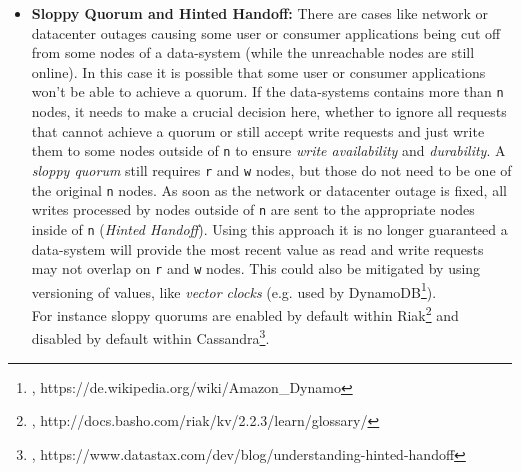 {\begin{itemize}
\item \textbf{Sloppy Quorum and Hinted Handoff:} There are cases like network or datacenter outages causing some user or consumer applications being cut off from some nodes of a data-system (while the unreachable nodes are still online). In this case it is possible that some user or consumer applications won't be able to achieve a quorum. If the data-systems contains more than \lstinline{n} nodes, it needs to make a crucial decision here, whether to ignore all requests that cannot achieve a quorum or still accept write requests and just write them to some nodes outside of \lstinline{n} to ensure \textit{write availability} and \textit{durability}. A \textit{sloppy quorum} still requires \lstinline{r} and \lstinline{w} nodes, but those do not need to be one of the original \lstinline{n} nodes. As soon as the network or datacenter outage is fixed, all writes processed by nodes outside of \lstinline{n} are sent to the appropriate nodes inside of \lstinline{n} (\textit{Hinted Handoff}). Using this approach it is no longer guaranteed a data-system will provide the most recent value as read and write requests may not overlap on \lstinline{r} and \lstinline{w} nodes. This could also be mitigated by using versioning of values, like \textit{vector clocks} (e.g. used by DynamoDB\footnote{\cite{DYNVC}, https://de.wikipedia.org/wiki/Amazon\_Dynamo}).\\
For instance sloppy quorums are enabled by default within Riak\footnote{\cite{RIASQ}, http://docs.basho.com/riak/kv/2.2.3/learn/glossary/} and disabled by default within Cassandra\footnote{\cite{CASSSQ}, https://www.datastax.com/dev/blog/understanding-hinted-handoff}.\\
\end{itemize}


\newpage
}
